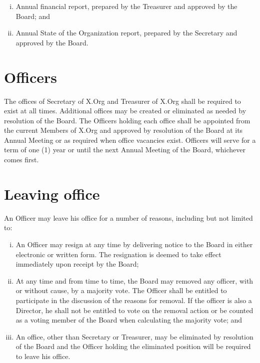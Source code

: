 \documentclass[10pt, english]{bylaws}
\begin{document}
\begin{enumerate}[(i)\hspace{.2cm}]
	\item Annual financial report, prepared by the Treasurer and approved by
	the Board; and

	\item Annual State of the Organization report, prepared by the Secretary
	and approved by the Board.
\end{enumerate}

\section{Officers}
The offices of Secretary of X.Org and Treasurer of X.Org shall be required
to exist at all times.  Additional offices may be created or eliminated as
needed by resolution of the Board.  The Officers holding each office shall be
appointed from the current Members of X.Org and approved by resolution of the
Board at its Annual Meeting or as required when office vacancies exist.
Officers will serve for a term of one (1) year or until the next Annual Meeting
of the Board, whichever comes first.

\section{Leaving office}
An Officer may leave his office for a number of reasons, including but not
limited to:

\begin{enumerate}[(i)\hspace{.2cm}]
	\item An Officer may resign at any time by delivering notice to the
	Board in either electronic or written form.  The resignation is deemed
	to take effect immediately upon receipt by the Board;

	\item At any time and from time to time, the Board may removed any
	officer, with or without cause, by a majority vote.  The Officer shall
	be entitled to participate in the discussion of the reasons for removal.
	If the officer is also a Director, he shall not be entitled to vote on
	the removal action or be counted as a voting member of the Board when
	calculating the majority vote; and

	\item An office, other than Secretary or Treasurer, may be eliminated by
	resolution of the Board and the Officer holding the eliminated position
	will be required to leave his office.

\end{enumerate}
\end{document}
